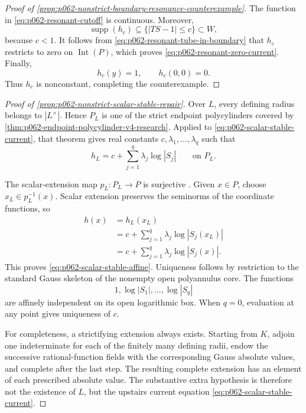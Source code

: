 \begin{proof}[Proof of
\cref{prop:p062-nonstrict-boundary-resonance-counterexample}]
The function in \eqref{eq:p062-resonant-cutoff} is continuous.  Moreover,
\[
 \operatorname{supp}(h_c)
       \subseteq\{|TS-1|\leq c\}
       \subset W,
\]
because \(c<1\).  It follows from
\eqref{eq:p062-resonant-tube-in-boundary} that \(h_c\) restricts to zero
on \(\operatorname{Int}(P)\), which proves
\eqref{eq:p062-resonant-zero-current}.  Finally,
\[
                         h_c(y)=1,
                         \qquad h_c(0,0)=0.
\]
Thus \(h_c\) is nonconstant, completing the counterexample.
\end{proof}

\begin{proof}[Proof of
\cref{prop:p062-nonstrict-scalar-stable-repair}]
Over \(L\), every defining radius belongs to \(|L^\times|\).  Hence
\(P_L\) is one of the strict endpoint polycylinders covered by
\cref{thm:p062-endpoint-polycylinder-v4-research}.  Applied to
\eqref{eq:p062-scalar-stable-current}, that theorem gives real constants
\(c,\lambda_1,\ldots,\lambda_q\) such that
\begin{equation}\label{eq:p062-scalar-stable-upstairs-formula}
          h_L=c+\sum_{j=1}^q\lambda_j\log|S_j|
          \qquad\text{on }P_L.
\end{equation}

The scalar-extension map \(p_L:P_L\to P\) is surjective
\cite[\S11.1.9]{CLD25}.  Given \(x\in P\), choose
\(x_L\in p_L^{-1}(x)\).  Scalar extension preserves the seminorms of the
coordinate functions, so
\[
 \begin{aligned}
 h(x)
   &=h_L(x_L)\\
   &=c+\sum_{j=1}^q\lambda_j\log|S_j(x_L)|\\
   &=c+\sum_{j=1}^q\lambda_j\log|S_j(x)|.
 \end{aligned}
\]
This proves \eqref{eq:p062-scalar-stable-affine}.  Uniqueness follows by
restriction to the standard Gauss skeleton of the nonempty open
polyannulus core.  The functions
\[
                  1,\log|S_1|,\ldots,\log|S_q|
\]
are affinely independent on its open logarithmic box.  When \(q=0\),
evaluation at any point gives uniqueness of \(c\).

For completeness, a strictifying extension always exists.  Starting from
\(K\), adjoin one indeterminate for each of the finitely many defining
radii, endow the successive rational-function fields with the corresponding
Gauss absolute values, and complete after the last step.  The resulting
complete extension has an element of each prescribed absolute value.  The
substantive extra hypothesis is therefore not the existence of \(L\), but
the upstairs current equation
\eqref{eq:p062-scalar-stable-current}.
\end{proof}
